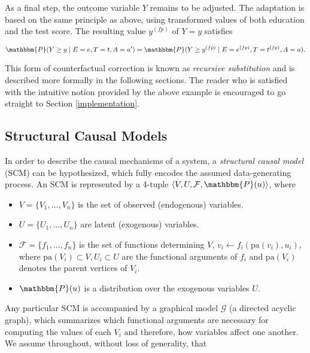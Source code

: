 \documentclass[
  nojss]{jss}
\providecommand{\tightlist}{%
  \setlength{\itemsep}{0pt}\setlength{\parskip}{0pt}}
\begin{document}
As a final step, the outcome variable \(Y\) remains to be adjusted. The
adaptation is based on the same principle as above, using transformed
values of both education and the test score. The resulting value
\( {y}^{(fp)}\) of \(Y = y\) satisfies

\begin{equation} \label{eq:labeltransform}
    \mathbbm{P}(Y \geq y \mid E = e, T = t, A = a') = \mathbbm{P}(Y \geq  {y}^{(fp)} \mid E =  {e}^{(fp)}, T =  {t}^{(fp)}, A = a).
\end{equation}

This form of counterfactual correction is known as \emph{recursive
substitution} \citep[Chapter~7]{pearl2009causality} and is described
more formally in the following sections. The reader who is satisfied
with the intuitive notion provided by the above example is encouraged to
go straight to Section \ref{implementation}.

\hypertarget{structural-causal-models}{%
\subsection{Structural Causal Models}\label{structural-causal-models}}

In order to describe the causal mechanisms of a system, a
\emph{structural causal model} (SCM) can be hypothesized, which fully
encodes the assumed data-generating process. An SCM is represented by a
4-tuple \(\langle V, U, \mathcal{F}, \mathbbm{P}(u) \rangle\), where

\begin{itemize}
\tightlist
\item
  \(V = \lbrace V_1, \ldots, V_n \rbrace\) is the set of observed
  (endogenous) variables.
\item
  \(U = \lbrace U_1, \ldots, U_n \rbrace\) are latent (exogenous)
  variables.
\item
  \(\mathcal{F} = \lbrace f_1, \ldots, f_n \rbrace\) is the set of
  functions determining \(V\), \(v_i \gets f_i(\mathrm{pa}(v_i), u_i)\),
  where \(\mathrm{pa}(V_i) \subset V, U_i \subset U\) are the functional
  arguments of \(f_i\) and \(\mathrm{pa}(V_i)\) denotes the parent
  vertices of \(V_i\).
\item
  \(\mathbbm{P}(u)\) is a distribution over the exogenous variables
  \(U\).
\end{itemize}

Any particular SCM is accompanied by a graphical model \(\mathcal{G}\)
(a directed acyclic graph), which summarizes which functional arguments
are necessary for computing the values of each \(V_i\) and therefore,
how variables affect one another. We assume throughout, without loss of
generality, that
\end{document}
